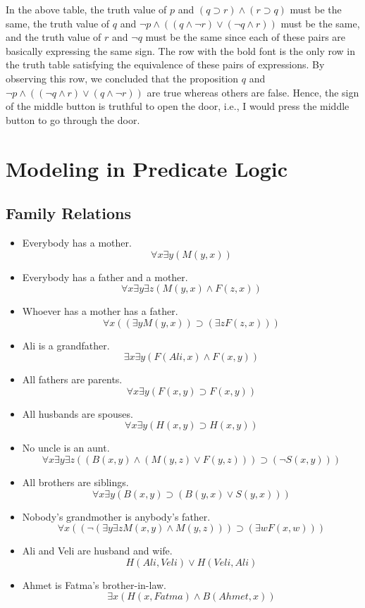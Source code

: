 \documentclass[11pt,a4paper]{article}
\begin{document}
\noindent
In the above table, the truth value of $p$ and $(q \supset r) \land (r \supset q)$ must be the same, the truth value of $q$ and $\neg p \land ((q \land \neg r) \lor (\neg q \land r))$ must be the same, and the truth value of $r$ and $\neg q$ must be the same since each of these pairs are basically expressing the same sign. The row with the bold font is the only row in the truth table satisfying the equivalence of these pairs of expressions. By observing this row, we concluded that the proposition $q$ and $\neg p \land ((\neg q \land r) \lor (q \land \neg r))$ are true whereas others are false. Hence, the sign of the middle button is truthful to open the door, i.e., I would press the middle button to go through the door.






\newpage

\section{Modeling in Predicate Logic}

\subsection{Family Relations}

\begin{itemize}
\item Everybody has a mother.
	\[
		\forall x \exists y (M(y, x))
	\]
\item Everybody has a father and a mother.
	\[
		\forall x \exists y \exists z( M(y, x) \land F(z, x))
	\]
\item Whoever has a mother has a father.
	\[
		\forall x ((\exists y M(y, x)) \supset (\exists z F(z, x)))
	\]
\item Ali is a grandfather.
	\[
		\exists x \exists y (F(Ali, x) \land F(x, y))
	\]
\item All fathers are parents.
	\[
		\forall x \exists y (F(x, y) \supset F(x, y))
	\]
\item All husbands are spouses.
	\[
		\forall x \exists y (H(x, y) \supset H(x, y))
	\]
\item No uncle is an aunt.
	\[
		\forall x \exists y \exists z ((B(x, y) \land (M(y, z) \lor F(y, z))) \supset (\neg S(x, y)))
	\]
\item All brothers are siblings.
	\[
		\forall x \exists y (B(x, y) \supset (B(y, x) \lor S(y, x)))
	\]
\item Nobody’s grandmother is anybody’s father.
	\[
		\forall x ((\neg (\exists y \exists z M(x, y) \land M(y, z))) \supset (\exists w F(x, w)))
	\]
\item Ali and Veli are husband and wife.
	\[
		H(Ali, Veli) \lor H(Veli, Ali)%
	\]
\item Ahmet is Fatma’s brother-in-law.
	\[
		\exists x (H(x, Fatma) \land B(Ahmet, x))
	\]
\end{itemize}
\end{document}
